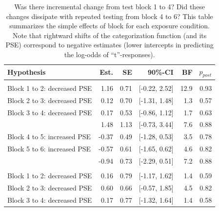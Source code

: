 \documentclass[
  11pt,
  man,mask,floatsintext]{apa6}
\begin{document}
\begin{table}[H]
\centering
\caption{\label{tab:hypothesis-table-simple-effects-block}Was there incremental change from test block 1 to 4? Did these changes dissipate with repeated testing from block 4 to 6? This table summarizes the simple effects of block for each exposure condition. Note that rightward shifts of the categorization function (and its PSE) correspond to negative estimates (lower intercepts in predicting the log-odds of ``t''-responses).}
\centering
\begin{tabular}[t]{>{\raggedright\arraybackslash}p{15em}rrrrr}
\toprule
Hypothesis & Est. & SE & 90\%-CI & BF & $p_{post}$\\
\midrule
\addlinespace[0.3em]
\multicolumn{6}{l}{\textbf{Difference between blocks: baseline}}\\
\hspace{1em}Block 1 to 2: decreased PSE & 1.16 & 0.71 & {}[-0.22, 2.52] & 12.9 & 0.93\\
\hspace{1em}Block 2 to 3: decreased PSE & 0.12 & 0.70 & {}[-1.31, 1.48] & 1.3 & 0.57\\
\hspace{1em}Block 3 to 4: decreased PSE & 0.17 & 0.53 & {}[-0.86, 1.12] & 1.7 & 0.63\\
\hspace{1em}{\em Block 1 to 4: decreased PSE} & 1.48 & 1.13 & {}[-0.73, 3.44] & 7.6 & 0.88\\
\hspace{1em}Block 4 to 5: increased PSE & -0.37 & 0.49 & {}[-1.28, 0.53] & 3.5 & 0.78\\
\hspace{1em}Block 5 to 6: increased PSE & -0.57 & 0.61 & {}[-1.65, 0.62] & 4.6 & 0.82\\
\hspace{1em}{\em Block 4 to 6: increased PSE} & -0.94 & 0.73 & {}[-2.29, 0.51] & 7.2 & 0.88\\
\addlinespace[0.3em]
\multicolumn{6}{l}{\textbf{Difference between blocks: +10}}\\
\hspace{1em}Block 1 to 2: decreased PSE & 0.16 & 0.79 & {}[-1.17, 1.62] & 1.4 & 0.59\\
\hspace{1em}Block 2 to 3: decreased PSE & 0.60 & 0.66 & {}[-0.57, 1.85] & 4.5 & 0.82\\
\hspace{1em}Block 3 to 4: decreased PSE & 0.17 & 0.77 & {}[-1.32, 1.64] & 1.4 & 0.58\\

\end{tabular}
\end{table}
\end{document}
